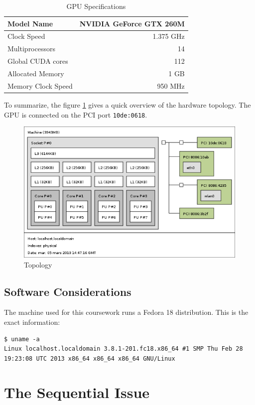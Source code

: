 \documentclass[fleqn,11pt]{SelfArx} %
\begin{document}
\begin{table}[h]
\centering
\begin{tabular}{|l|r|}
\hline
Model Name & NVIDIA GeForce GTX 260M \\
\hline
Clock Speed & 1.375 GHz \\
\hline
Multiprocessors & 14 \\
\hline
Global CUDA cores & 112 \\
\hline
Allocated Memory & 1 GB \\
\hline
Memory Clock Speed & 950 MHz \\
\hline
\end{tabular}
\caption{GPU Specifications}
\label{GPUspecs}
\end{table}

To summarize, the figure \ref{topo} gives a quick overview of the hardware topology. The GPU is connected on the PCI port \verb+10de:0618+.

\begin{figure}[h]
\centering
\includegraphics[width=.48\textwidth]{topo.png}
\caption{Topology}
\label{topo}
\end{figure}

\subsection{Software Considerations}

The machine used for this coursework runs a Fedora 18 distribution. This is the exact information:
\begin{lstlisting}
$ uname -a
Linux localhost.localdomain 3.8.1-201.fc18.x86_64 #1 SMP Thu Feb 28 19:23:08 UTC 2013 x86_64 x86_64 x86_64 GNU/Linux
\end{lstlisting}



\section{The Sequential Issue}
\end{document}
